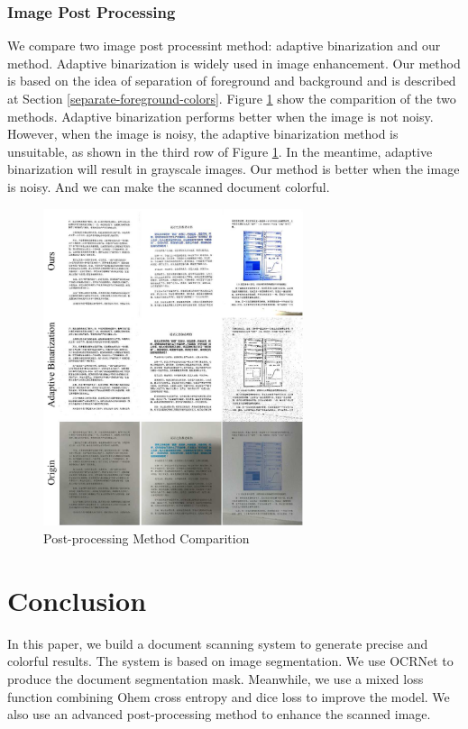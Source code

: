 \documentclass[10pt, conference, compsocconf]{IEEEtran}
\begin{document}
\subsubsection{Image Post Processing}
We compare two image post processint method: adaptive binarization and our method. 
Adaptive binarization is widely used in image enhancement. 
Our method is based on the idea of separation of foreground and background and is described at Section \ref{separate-foreground-colors}.
Figure \ref{figure:post-process} show the comparition of the two methods.
Adaptive binarization performs better when the image is not noisy.
However, when the image is noisy, the adaptive binarization method is unsuitable, as shown in the third row of Figure \ref{figure:post-process}.
In the meantime, adaptive binarization will result in grayscale images.
Our method is better when the image is noisy. 
And we can make the scanned document colorful.

\begin{figure}[!h]
	\centering
	\label{figure:post-process}
	\includegraphics[width=3.0in]{./Assets/12345.jpg}
	\caption{Post-processing Method Comparition}
\end{figure}



\section{Conclusion}

In this paper, we build a document scanning system to generate precise and colorful results.
The system is based on image segmentation. We use OCRNet to produce the document segmentation mask. Meanwhile, we use a mixed loss function combining Ohem cross entropy and dice loss to improve the model.
We also use an advanced post-processing method to enhance the scanned image.
\end{document}
